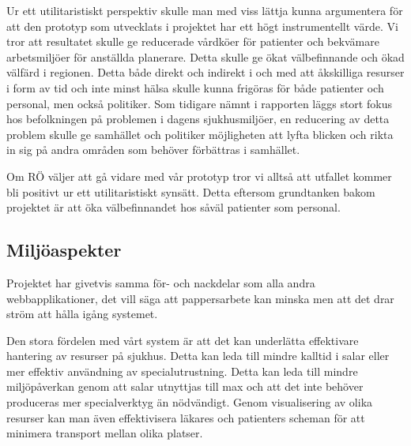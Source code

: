 Ur ett utilitaristiskt perspektiv skulle man med viss lättja kunna argumentera för att den prototyp som utvecklats i projektet har ett högt instrumentellt värde. Vi tror att resultatet skulle ge reducerade vårdköer för patienter och bekvämare arbetsmiljöer för anställda planerare. Detta skulle ge ökat välbefinnande och ökad välfärd i regionen. Detta både direkt och indirekt i och med att åkskilliga resurser i form av tid och inte minst hälsa skulle kunna frigöras för både patienter och personal, men också politiker.  Som tidigare nämnt i rapporten läggs stort fokus hos befolkningen på problemen i dagens sjukhusmiljöer, en reducering av detta problem skulle ge samhället och politiker möjligheten att lyfta blicken och rikta in sig på andra områden som behöver förbättras i samhället.

Om RÖ väljer att gå vidare med vår prototyp tror vi alltså att utfallet kommer bli positivt ur ett utilitaristiskt synsätt. Detta eftersom grundtanken bakom projektet är att öka välbefinnandet hos såväl patienter som personal. 

\subsection{Miljöaspekter}
Projektet har givetvis samma för- och nackdelar som alla andra webbapplikationer, det vill säga att pappersarbete kan minska men att det drar ström att hålla igång systemet.

Den stora fördelen med vårt system är att det kan underlätta effektivare hantering av resurser på sjukhus. Detta kan leda till mindre kalltid i salar eller mer effektiv användning av specialutrustning. Detta kan leda till mindre miljöpåverkan genom att salar utnyttjas till max och att det inte behöver produceras mer specialverktyg än nödvändigt. Genom visualisering av olika resurser kan man även effektivisera läkares och patienters scheman för att minimera transport mellan olika platser. 